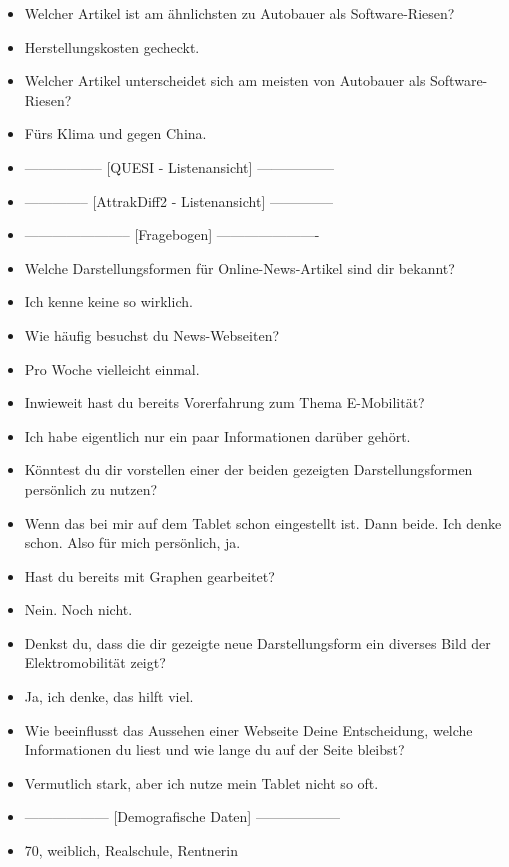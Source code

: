 {\begin{itemize}[]
        \item {} Welcher Artikel ist am ähnlichsten zu \flqq Autobauer als Software-Riesen\frqq{}?
        \item {} \flqq Herstellungskosten gecheckt\frqq{}.
        \item {} Welcher Artikel unterscheidet sich am meisten von \flqq Autobauer als Software-Riesen\frqq{}?
        \item {} \flqq Fürs Klima und gegen China\frqq{}.
        \item {-----------------} [QUESI - Listenansicht] {-----------------}
        \item {--------------} [AttrakDiff2 - Listenansicht] {--------------}
        \item {-----------------------} [Fragebogen] {----------------------}
        \item {} Welche Darstellungsformen für Online-News-Artikel sind dir bekannt?
        \item {} Ich kenne keine so wirklich.
        \item {} Wie häufig besuchst du News-Webseiten?
        \item {} Pro Woche vielleicht einmal.
        \item {} Inwieweit hast du bereits Vorerfahrung zum Thema E-Mobilität?
        \item {} Ich habe eigentlich nur ein paar Informationen darüber gehört.
        \item {} Könntest du dir vorstellen einer der beiden gezeigten Darstellungsformen persönlich zu nutzen?
        \item {} Wenn das bei mir auf dem Tablet schon eingestellt ist.
              Dann beide.
              Ich denke schon.
              Also für mich persönlich, ja.
        \item {} Hast du bereits mit Graphen gearbeitet?
        \item {} Nein. Noch nicht.
        \item {} Denkst du, dass die dir gezeigte neue Darstellungsform ein diverses Bild der Elektromobilität zeigt?
        \item {} Ja, ich denke, das hilft viel.
        \item {} Wie beeinflusst das Aussehen einer Webseite Deine Entscheidung, welche Informationen du liest und wie lange du auf der Seite bleibst?
        \item {} Vermutlich stark, aber ich nutze mein Tablet nicht so oft.
        \item {------------------} [Demografische Daten] {------------------}
        \item {} 70, weiblich, Realschule, Rentnerin
    \end{itemize}}
\nolinenumbers

